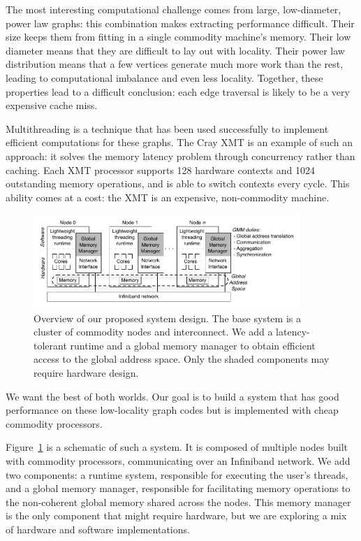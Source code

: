 \documentclass{acm_proc_article-sp}
\begin{document}
The most interesting computational challenge comes from large,
low-diameter, power law graphs: this combination makes extracting
performance difficult. Their size keeps them from fitting in a single
commodity machine's memory. Their low diameter means that they are
difficult to lay out with locality. Their power law distribution means
that a few vertices generate much more work than the rest, leading to
computational imbalance and even less locality. Together, these
properties lead to a difficult conclusion: each edge traversal is
likely to be a very expensive cache miss.

Multithreading is a technique that has been used successfully to
implement efficient computations for these graphs. The Cray XMT is an
example of such an approach: it solves the memory latency problem
through concurrency rather than caching. Each XMT processor supports
128 hardware contexts and 1024 outstanding memory operations, and is
able to switch contexts every cycle. This ability comes at a cost: the
XMT is an expensive, non-commodity machine.


\begin{figure}[htbp]
  \begin{center}
    \includegraphics[width=0.9\textwidth]{figures/system-overview.pdf}
	\end{center}
	\caption{Overview of our proposed system design. The base
          system is a cluster of commodity nodes and interconnect. We
          add a latency-tolerant runtime and a global memory manager
          to obtain efficient access to the global address space. Only
          the shaded components may require hardware design.}
	\label{fig:system-overview}
\end{figure}

We want the best of both worlds. Our goal is to build a system that
has good performance on these low-locality graph codes but is
implemented with cheap commodity processors.

Figure~\ref{fig:system-overview} is a schematic of such a
system. It is composed of multiple nodes built with commodity
processors, communicating over an Infiniband network. We add two
components: a runtime system, responsible for executing the user's threads,
and a global memory manager, responsible for facilitating memory
operations to the non-coherent global memory shared across the nodes.
This memory manager is the only component that might require hardware,
but we are exploring a mix of hardware and software implementations.
\end{document}
